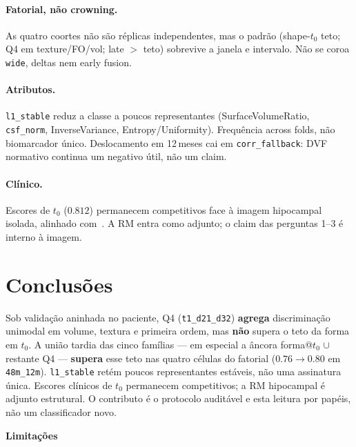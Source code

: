 \documentclass[review]{elsarticle}
\newcommand{\code}[1]{\texttt{#1}}
\newcommand{\sugestao}[2]{%
	\textcolor{red}{\sout{\textbf{#1}}}%
	\textcolor{blue!100!black}{\textbf{#2}}%
}
\begin{document}
\paragraph{Fatorial, não crowning.}
As quatro coortes não são réplicas independentes, mas o padrão (shape-$t_0$ teto; Q4 em texture/FO/vol; late $>$ teto) sobrevive a janela e intervalo.
Não se coroa \code{wide}, deltas nem early fusion.

\paragraph{Atributos.}
\code{l1\_stable} reduz a classe a poucos representantes (SurfaceVolumeRatio, \code{csf\_norm}, InverseVariance, Entropy/Uniformity).
Frequência across folds, não biomarcador único.
Deslocamento em 12\,meses cai em \code{corr\_fallback}: DVF normativo continua um negativo útil, não um claim.

\paragraph{Clínico.}
Escores de $t_0$ ($0.812$) permanecem competitivos face à imagem hipocampal isolada, alinhado com~\citet{grassi-2019,moradi-2015}.
A RM entra como adjunto; o claim das perguntas 1--3 é interno à imagem.


\section{Conclusões}\label{sec:Conclusions}

Sob validação aninhada no paciente, Q4 (\code{t1\_d21\_d32}) \textbf{agrega} discriminação unimodal em volume, textura e primeira ordem, mas \textbf{não} supera o teto da forma em $t_0$.
A união tardia das cinco famílias --- em especial a âncora forma@$t_0$ $\cup$ restante Q4 --- \textbf{supera} esse teto nas quatro células do fatorial ($0.76\to 0.80$ em \code{48m\_12m}).
\code{l1\_stable} retém poucos representantes estáveis, não uma assinatura única.
Escores clínicos de $t_0$ permanecem competitivos; a RM hipocampal é adjunto estrutural.
O contributo é o protocolo auditável e esta leitura por papéis, não um classificador novo.

\sugestao{}{Limitações} 
\end{document}
